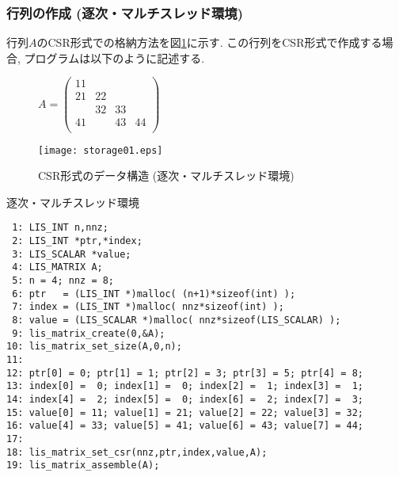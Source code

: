 \documentclass[a4paper]{jarticle}
\begin{document}
{{\subsubsection{行列の作成 (逐次・マルチスレッド環境)}
行列$A$のCSR形式での格納方法を図\ref{fig:storage01}に示す. 
この行列をCSR形式で作成する場合, プログラムは以下のように記述する. 
\begin{figure}[h]
{\centering 
\begin{minipage}{0.3\textwidth}
\begin{flushright}
$ \label{eq:mata}
A = \left(
\begin{array}{cccc}
11 &    &    &    \\
21 & 22 &    &    \\
   & 32 & 33 &    \\
41 &    & 43 & 44 \\
\end{array}\right)
$
\end{flushright}
\end{minipage}
\begin{minipage}{0.6\textwidth}
\begin{flushleft}
\texttt{[image: storage01.eps]} 
\end{flushleft}
\end{minipage}
\caption{CSR形式のデータ構造 (逐次・マルチスレッド環境)}\label{fig:storage01}}
\end{figure}
\begin{itembox}[l]{逐次・マルチスレッド環境}
\small
\begin{verbatim}
 1: LIS_INT n,nnz;
 2: LIS_INT *ptr,*index;
 3: LIS_SCALAR *value;
 4: LIS_MATRIX A;
 5: n = 4; nnz = 8;
 6: ptr   = (LIS_INT *)malloc( (n+1)*sizeof(int) );
 7: index = (LIS_INT *)malloc( nnz*sizeof(int) );
 8: value = (LIS_SCALAR *)malloc( nnz*sizeof(LIS_SCALAR) );
 9: lis_matrix_create(0,&A);
10: lis_matrix_set_size(A,0,n);
11:
12: ptr[0] = 0; ptr[1] = 1; ptr[2] = 3; ptr[3] = 5; ptr[4] = 8;
13: index[0] =  0; index[1] =  0; index[2] =  1; index[3] =  1;
14: index[4] =  2; index[5] =  0; index[6] =  2; index[7] =  3;
15: value[0] = 11; value[1] = 21; value[2] = 22; value[3] = 32;
16: value[4] = 33; value[5] = 41; value[6] = 43; value[7] = 44;
17:
18: lis_matrix_set_csr(nnz,ptr,index,value,A);
19: lis_matrix_assemble(A);
\end{verbatim}
\end{itembox}

}}
\end{document}
